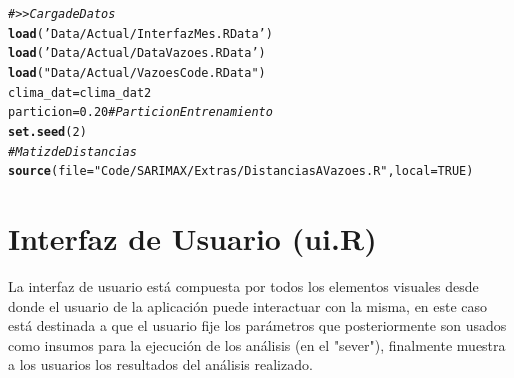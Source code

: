 \documentclass[12pt,oneside]{book}\usepackage[]{graphicx}\usepackage[]{color}
\makeatletter
\newcommand{\hlnum}[1]{\textcolor[rgb]{0.686,0.059,0.569}{#1}}%
\newcommand{\hlstr}[1]{\textcolor[rgb]{0.192,0.494,0.8}{#1}}%
\newcommand{\hlcom}[1]{\textcolor[rgb]{0.678,0.584,0.686}{\textit{#1}}}%
\newcommand{\hlstd}[1]{\textcolor[rgb]{0.345,0.345,0.345}{#1}}%
\newcommand{\hlkwb}[1]{\textcolor[rgb]{0.69,0.353,0.396}{#1}}%
\newcommand{\hlkwc}[1]{\textcolor[rgb]{0.333,0.667,0.333}{#1}}%
\newcommand{\hlkwd}[1]{\textcolor[rgb]{0.737,0.353,0.396}{\textbf{#1}}}%
\newenvironment{kframe}{%
 \def\at@end@of@kframe{}%
 \ifinner\ifhmode%
  \def\at@end@of@kframe{\end{minipage}}%
  \begin{minipage}{\columnwidth}%
 \fi\fi%
 \def\FrameCommand##1{\hskip\@totalleftmargin \hskip-\fboxsep
 \colorbox{shadecolor}{##1}\hskip-\fboxsep
     \hskip-\linewidth \hskip-\@totalleftmargin \hskip\columnwidth}%
 \MakeFramed {\advance\hsize-\width
   \@totalleftmargin\z@ \linewidth\hsize
   \@setminipage}}%
 {\par\unskip\endMakeFramed%
 \at@end@of@kframe}
\newenvironment{knitrout}{}{} %
\theoremstyle{definition} %
\makeatother
\begin{document}
\begin{knitrout}
\begin{kframe}
\begin{alltt}
\hlcom{#>> Carga de Datos}
\hlkwd{load}\hlstd{(}\hlstr{'Data/Actual/InterfazMes.RData'}\hlstd{)}
\hlkwd{load}\hlstd{(}\hlstr{'Data/Actual/DataVazoes.RData'}\hlstd{)}
\hlkwd{load}\hlstd{(}\hlstr{"Data/Actual/VazoesCode.RData"}\hlstd{)}
\hlstd{clima_dat}\hlkwb{=}\hlstd{clima_dat2}
\hlstd{particion} \hlkwb{=} \hlnum{0.20} \hlcom{#Particion Entrenamiento}
\hlkwd{set.seed}\hlstd{(}\hlnum{2}\hlstd{)}
\hlcom{# Matiz de Distancias }
\hlkwd{source}\hlstd{(}\hlkwc{file} \hlstd{=}\hlstr{"Code/SARIMAX/Extras/DistanciasAVazoes.R"}\hlstd{,}\hlkwc{local} \hlstd{=} \hlnum{TRUE}\hlstd{)}
\end{alltt}
\end{kframe}
\end{knitrout}


\section{Interfaz de Usuario (ui.R)}

La interfaz de usuario está compuesta por todos los elementos visuales desde donde el usuario de la aplicación puede interactuar con la misma, en este caso está destinada a que el usuario fije los parámetros que posteriormente son usados como insumos para la ejecución de los análisis (en el "sever"), finalmente muestra a los usuarios los resultados del análisis realizado.
\end{document}
